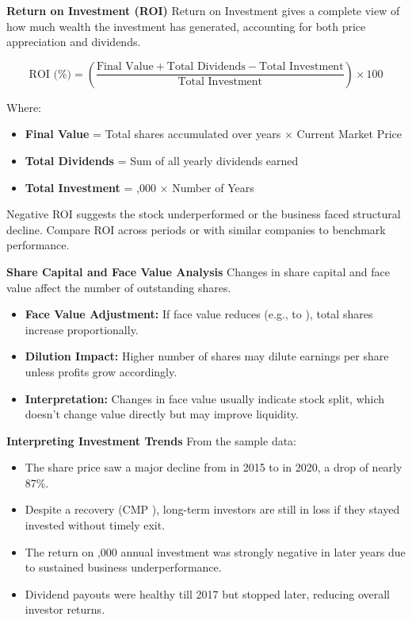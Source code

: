 \documentclass[12pt]{article}
\begin{document}
\textbf{Return on Investment (ROI)}
Return on Investment gives a complete view of how much wealth the investment has generated, accounting for both price appreciation and dividends.

\[
\text{ROI (\%)} = \left( \frac{\text{Final Value} + \text{Total Dividends} - \text{Total Investment}}{\text{Total Investment}} \right) \times 100
\]

Where:
\begin{itemize}
    \item \textbf{Final Value} = Total shares accumulated over years × Current Market Price
    \item \textbf{Total Dividends} = Sum of all yearly dividends earned
    \item \textbf{Total Investment} = ,000 × Number of Years
\end{itemize}

Negative ROI suggests the stock underperformed or the business faced structural decline. Compare ROI across periods or with similar companies to benchmark performance.

\textbf{Share Capital and Face Value Analysis}
Changes in share capital and face value affect the number of outstanding shares.

\begin{itemize}
    \item \textbf{Face Value Adjustment:} If face value reduces (e.g.,  to ), total shares increase proportionally.
    \item \textbf{Dilution Impact:} Higher number of shares may dilute earnings per share unless profits grow accordingly.
    \item \textbf{Interpretation:} Changes in face value usually indicate stock split, which doesn't change value directly but may improve liquidity.
\end{itemize}

\textbf{Interpreting Investment Trends}
From the sample data:
\begin{itemize}
    \item The share price saw a major decline from  in 2015 to  in 2020, a drop of nearly 87\%.
    \item Despite a recovery (CMP ), long-term investors are still in loss if they stayed invested without timely exit.
    \item The return on ,000 annual investment was strongly negative in later years due to sustained business underperformance.
    \item Dividend payouts were healthy till 2017 but stopped later, reducing overall investor returns.
\end{itemize}
\end{document}
